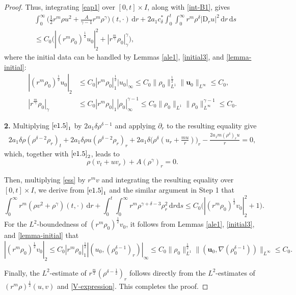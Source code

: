 \documentclass[11pt,reqno]{amsart}
\numberwithin{rk}{section}
\numberwithin{prop}{section}
\numberwithin{mydef}{section}
\numberwithin{lem}{section}
\numberwithin{equation}{section}
\numberwithin{thm}{section}
\begin{document}
\begin{proof}
Thus, integrating \eqref{eap1} over $[0,t]\times I$, along with \eqref{int-B1}, gives
\begin{equation*}\label{eap2}
\begin{aligned}
&\int_0^\infty \big(\frac{1}{2} r^m\rho u^2+\frac{A}{\gamma-1}r^m\rho^\gamma\big)(t,\cdot) \,\mathrm{d}r+ 2a_1 c^*_\delta\int_0^t\int_0^\infty r^m\rho^\delta|\mathrm{D}_r u|^2\,\mathrm{d}r\,\mathrm{d}s\\
&\leq C_0\big(|(r^m\rho_0)^\frac{1}{2}u_0|_2^2+|r^\frac{m}{\gamma}\rho_0|_\gamma^\gamma\big), 
\end{aligned}
\end{equation*}
where the initial data can be handled by Lemmas \ref{ale1}, \ref{initial3}, and \ref{lemma-initial}:
\begin{equation*}
\begin{aligned}
|(r^m\rho_0)^\frac{1}{2} u_0|_2&\leq C_0|r^m\rho_0|_1^\frac{1}{2}|u_0|_\infty \leq C_0 \|\rho_0\|_{L^1}^\frac{1}{2}\|\boldsymbol{u}_0\|_{L^\infty} \leq C_0,\\
|r^\frac{m}{\gamma}\rho_0|_\gamma&\leq C_0|r^m\rho_0|_1 |\rho_0|_\infty^{\gamma-1} \leq C_0 \|\rho_0\|_{L^1} \|\rho_0\|_{L^\infty}^{\gamma-1} \leq C_0.
\end{aligned}
\end{equation*}

\smallskip
\textbf{2.} Multiplying $\eqref{e1.5}_1$ by $2a_1\delta\rho^{\delta-1}$ and applying $\partial_r$ to the resulting equality give 
\begin{align*}
2a_1\delta\rho(\rho^{\delta-2}\rho_r)_{t}+2a_1\delta\rho u(\rho^{\delta-2}\rho_r)_{r}+2a_1\delta\big(\rho^{\delta}(u_r+\frac{mu}{r})\big)_r-\frac{2a_1 m (\rho^{\delta})_ru}{r}=0,
\end{align*}
which, together with $\eqref{e1.5}_2$, leads to
\begin{equation}\label{ess}
\rho(v_t+u v_r)+A(\rho^\gamma)_r=0.
\end{equation}

Then, multiplying \eqref{ess} by $r^m v$ and 
integrating the resulting equality over $[0,t]\times I$, we derive from $\eqref{e1.5}_1$ and the similar argument in Step 1 that
\begin{equation*}
\int_0^\infty r^m(\rho v^2+\rho^\gamma)(t,\cdot)\,\mathrm{d}r+ \int_0^t\int_0^\infty r^m\rho^{\gamma+\delta-3}\rho_r^2\,\mathrm{d}r\mathrm{d}s
\leq C_0\big(|(r^m\rho_0)^\frac{1}{2}v_0 |_2^2+1\big).
\end{equation*}
For the $L^2$-boundedness of $(r^m\rho_0)^{\frac{1}{2}}v_0$, it follows from Lemmas \ref{ale1}, \ref{initial3}, and \ref{lemma-initial} that
\begin{equation*}
|(r^m\rho_0)^\frac{1}{2} v_0|_2 \leq C_0|r^m\rho_0|_1^\frac{1}{2}|(u_0,(\rho_0^{\delta-1})_r)|_\infty \leq C_0 \|\rho_0\|_{L^1}^\frac{1}{2}\|(\boldsymbol{u}_0,\nabla(\rho_0^{\delta-1}))\|_{L^\infty} \leq C_0.
\end{equation*}

Finally, the $L^2$-estimate of $r^\frac{m}{2}(\rho^{\delta-\frac{1}{2}})_r$ follows directly from the $L^2$-estimates of $(r^m\rho)^\frac{1}{2}(u,v)$ and \eqref{V-expression}. This completes the proof.
\end{proof}
\end{document}
